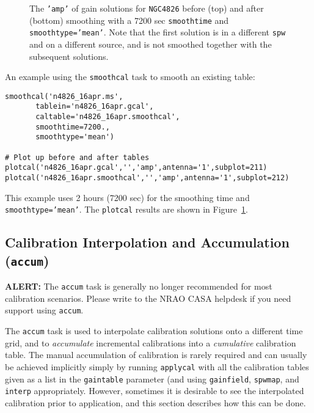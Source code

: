 \begin{figure}[h!]
\begin{center}
\caption{\label{fig:smoothcal_4826} The {\tt 'amp'} of gain solutions
for {\tt NGC4826} before (top) and after (bottom) smoothing with
a 7200 sec {\tt smoothtime} and {\tt smoothtype='mean'}.  Note that
the first solution is in a different {\tt spw} and on a different
source, and is not smoothed together with the subsequent solutions.}
\hrulefill
\end{center}
\end{figure}

An example using the {\tt smoothcal} task to smooth an existing table:
\small
\begin{verbatim}
smoothcal('n4826_16apr.ms',
       tablein='n4826_16apr.gcal',
       caltable='n4826_16apr.smoothcal',
       smoothtime=7200.,
       smoothtype='mean')

# Plot up before and after tables
plotcal('n4826_16apr.gcal','','amp',antenna='1',subplot=211)
plotcal('n4826_16apr.smoothcal','','amp',antenna='1',subplot=212)
\end{verbatim}
\normalsize
This example uses 2 hours (7200 sec) for the smoothing time and
{\tt smoothtype='mean'}.  The {\tt plotcal} results are shown
in Figure~\ref{fig:smoothcal_4826}.


\subsection{Calibration Interpolation and Accumulation ({\tt accum})}
\label{section:cal.tables.accum}

{\bf ALERT:} The {\tt accum} task is generally no longer recommended
for most calibration scenarios.  Please write to the NRAO CASA
helpdesk  if you need support using {\tt accum}.

The {\tt accum} task is used to interpolate calibration solutions onto
a different time grid, and to {\it accumulate} incremental
calibrations into a {\it cumulative} calibration table.  The manual
accumulation of calibration is rarely required and can usually be
achieved implicitly simply by running {\tt applycal} with all the
calibration tables given as a list in the {\tt gaintable} parameter
(and using {\tt gainfield}, {\tt spwmap}, and {\tt interp}
appropriately.  However, sometimes it is desirable to see the
interpolated calibration prior to application, and this section
describes how this can be done.

